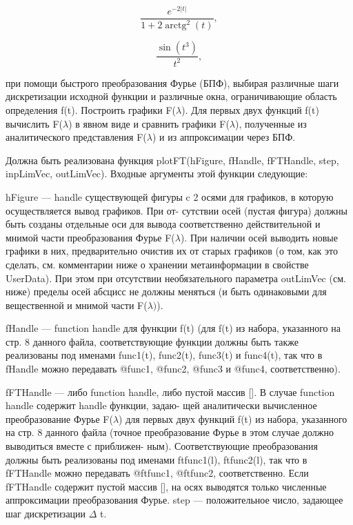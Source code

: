 \documentclass[11pt]{article}
\DeclareMathOperator{\arctg}{arctg}
\begin{document}
\begin{equation} \frac{e^{-2|t|}}{1+2\arctg^2(t)}, \end{equation}

\begin{equation} \frac{\sin(t^3)}{t^2}, \end{equation}

при помощи быстрого преобразования Фурье (БПФ), выбирая различные шаги дискретизации
исходной функции и различные окна, ограничивающие область определения f(t). Построить графики F($\lambda$). Для
первых двух функций f(t) вычислить F($\lambda$) в явном виде и сравнить графики F($\lambda$), полученные из аналитического
представления F($\lambda$) и из аппроксимации через БПФ.
\newline

Должна быть реализована функция plotFT(hFigure, fHandle, fFTHandle, step, inpLimVec, outLimVec).
Входные аргументы этой функции следующие:
\newline

hFigure — handle существующей фигуры c 2 осями для графиков, в которую осуществляется вывод графиков. При от-
сутствии осей (пустая фигура) должны быть созданы отдельные оси для вывода соответственно действительной
и мнимой части преобразования Фурье F($\lambda$). При наличии осей выводить новые графики в них, предварительно
очистив их от старых графиков (о том, как это сделать, см. комментарии ниже о хранении метаинформации в
свойстве UserData). При этом при отсутствии необязательного параметра outLimVec (см. ниже) пределы осей
абсцисс не должны меняться (и быть одинаковыми для вещественной и мнимой части F($\lambda)$).
\newline

fHandle — function handle для функции f(t) (для f(t) из набора, указанного на стр. 8 данного файла, соответствующие
функции должны быть также реализованы под именами func1(t), func2(t), func3(t) и func4(t), так что в
fHandle можно передавать @func1, @func2, @func3 и @func4, соответственно).
\newline

fFTHandle — либо function handle, либо пустой массив []. В случае function handle содержит handle функции, задаю-
щей аналитически вычисленное преобразование Фурье F($\lambda$) для первых двух функций f(t) из набора, указанного
на стр. 8 данного файла (точное преобразование Фурье в этом случае должно выводиться вместе с приближен-
ным). Соответствующие преобразования должны быть реализованы под именами ftfunc1(l), ftfunc2(l), так
что в fFTHandle можно передавать @ftfunc1, @ftfunc2, соответственно. Если fFTHandle содержит пустой массив
[], на осях выводятся только численные аппроксимации преобразования Фурье.
step — положительное число, задающее шаг дискретизации $\Delta$ t.
\newline
\end{document}
